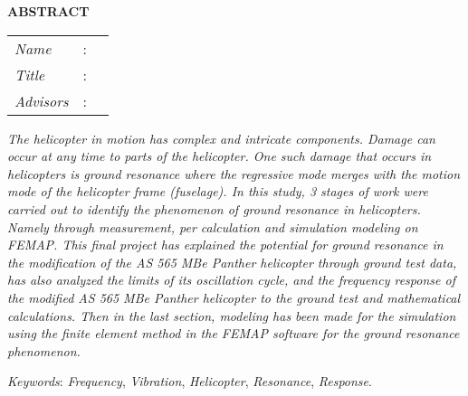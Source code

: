 \begin{center}
  \large\textbf{ABSTRACT}
\end{center}


\vspace{2ex}

\begingroup
\setlength{\tabcolsep}{0pt}

\noindent
\begin{tabularx}{\textwidth}{l >{\centering}m{3em} X}
  \emph{Name}     & : & \name{}         \\

  \emph{Title}    & : & \engtatitle{}   \\

  \emph{Advisors} & : & \advisor{}   \\
  
\end{tabularx}
\endgroup

\emph{The helicopter in motion has complex and intricate components. Damage can occur at any time to parts of the helicopter. One such damage that occurs in helicopters is ground resonance where the regressive mode merges with the motion mode of the helicopter frame (fuselage). In this study, 3 stages of work were carried out to identify the phenomenon of ground resonance in helicopters. Namely through measurement, per calculation and simulation modeling on FEMAP. This final project has explained the potential for ground resonance in the modification of the AS 565 MBe Panther helicopter through ground test data, has also analyzed the limits of its oscillation cycle, and the frequency response of the modified AS 565 MBe Panther helicopter to the ground test and mathematical calculations. Then in the last section, modeling has been made for the simulation using the finite element method in the FEMAP software for the ground resonance phenomenon.}

\emph{Keywords}: \emph{Frequency}, \emph{Vibration}, \emph{Helicopter}, \emph{Resonance}, \emph{Response}.
